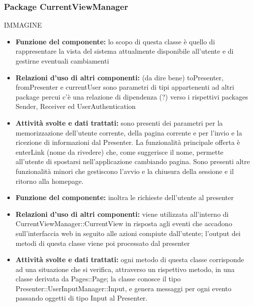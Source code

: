 \documentclass[a4paper,11pt]{article}
\begin{document}
		     \subsubsection{Package CurrentViewManager}
			IMMAGINE		    
		    	\begin{itemize}
		    \item\textbf{Funzione del componente:} lo scopo di questa classe è quello di rappresentare la vista del sistema attualmente disponibile all'utente e di gestirne eventuali cambiamenti 
			\item\textbf{Relazioni d'uso di altri componenti:} (da dire bene) toPresenter, fromPresenter e currentUser sono parametri di tipi appartenenti ad altri package percui c'è una 
relazione di dipendenza (?) verso i rispettivi packages Sender, Receiver ed UserAuthentication
			\item\textbf{Attività svolte e dati trattati:} sono presenti dei parametri per la memorizzazione dell'utente corrente, della pagina corrente e per l'invio e la ricezione di informazioni dal Presenter. La funzionalità principale offerta è enterLink (nome da rivedere) che, come suggerisce il nome, permette all'utente di spostarsi nell'applicazione cambiando pagina. Sono presenti altre funzionalità minori che gestiscono l'avvio e la chiusura della sessione e il ritorno alla homepage.
			\end{itemize}
			\begin{itemize}
			\item\textbf{Funzione del componente:} inoltra le richieste dell'utente al presenter
			\item\textbf{Relazioni d'uso di altri componenti:}  viene utilizzata all'interno di CurrentViewManager::CurrentView in risposta agli eventi che accadono sull'interfaccia web in seguito alle azioni compiute dall'utente; l'output dei metodi di questa classe viene poi processato dal presenter
			\item\textbf{Attività svolte e dati trattati:} ogni metodo di questa classe corrisponde ad una situazione che si verifica, attraverso un rispettivo metodo, in una classe derivata da Pages::Page; la classe conosce il tipo Presenter::UserInputManager::Input, e genera messaggi per ogni evento passando oggetti di tipo Input al Presenter.
			\end{itemize}
			
\end{document}
